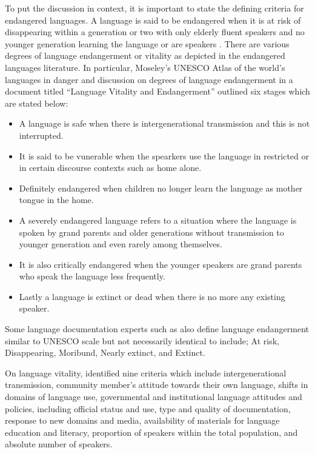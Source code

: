 \documentclass[output=paper,colorlinks,citecolor=brown]{langscibook}
\begin{document}
To put the discussion in context, it is important to state the defining criteria for endangered languages.  A language is said to be endangered when it is at risk of disappearing within a generation or two with only elderly fluent speakers and no younger generation learning the language or are speakers \citet[4]{Thomason2015}. There are various degrees of language endangerment or vitality as depicted in the endangered languages literature. In particular, Moseley’s \citep{Moseley2012} UNESCO Atlas of the world’s languages in danger and  discussion on degrees of language endangerment in a document titled “Language Vitality and Endangerment” outlined six stages which are stated below:


\begin{itemize}\sloppy
\item A language is safe when there is intergenerational transmission and this is not interrupted.
\item 	It is said to be vunerable when the spearkers use the language in restricted or in certain discourse contexts such as home alone.
\item 	Definitely endangered when children no longer learn the language as mother tongue in the home.
\item 	A severely endangered language refers to a situation where the language is spoken by grand parents and older generations without transmission to younger generation and even rarely among themselves.
\item 	It is also critically endangered when the younger speakers are grand parents who speak the language less frequently.
\item 	Lastly a language is extinct or dead when there is no more any existing speaker. 
\end{itemize}
Some language documentation experts such as \citet{GrenobleWhaley1996} also define language endangerment similar to UNESCO scale but not necessarily identical to include; At risk, Disappearing, Moribund, Nearly extinct, and Extinct.

\begin{sloppypar}
On language vitality, \citet[5]{unesco2011atlas} identified nine criteria which include intergenerational transmission, community member’s attitude towards their own language, shifts in domains of language use, governmental and institutional language attitudes and policies, including official status and use, type and quality of documentation, response to new domains and media, availability of materials for language education and literacy, proportion of speakers within the total population, and absolute number of speakers.
\end{sloppypar}
\end{document}
